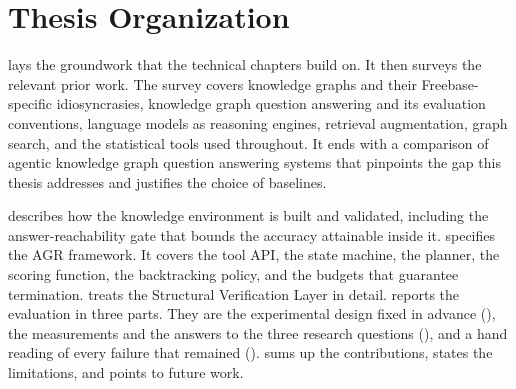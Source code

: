 \section{Thesis Organization}\label{sec:organization}

 lays the groundwork that the technical chapters build on.
It then surveys the relevant prior work. The survey covers knowledge graphs and
their Freebase-specific idiosyncrasies, knowledge graph question answering and
its evaluation conventions, language models as reasoning engines, retrieval
augmentation, graph search, and the statistical tools used throughout. It ends
with a comparison of agentic knowledge graph question answering systems that
pinpoints the gap this thesis addresses and justifies the choice of baselines.

 describes how the knowledge environment is built and
validated, including the answer-reachability gate that bounds the accuracy
attainable inside it.  specifies the AGR framework. It covers
the tool API, the state machine, the planner, the scoring function, the
backtracking policy, and the budgets that guarantee termination.
 treats the Structural Verification Layer in
detail.  reports the evaluation in three parts. They are the
experimental design fixed in advance (), the measurements and
the answers to the three research questions (), and a hand
reading of every failure that remained ().
 sums up the contributions, states the limitations, and
points to future work.
\endinput
